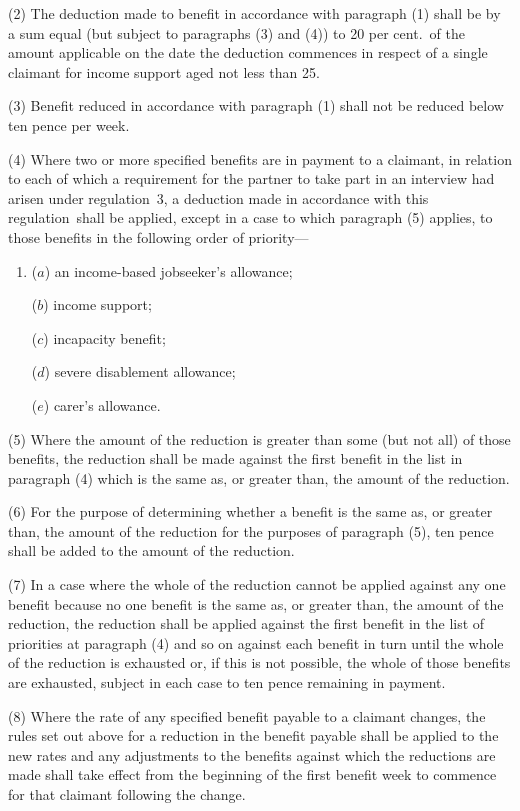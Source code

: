 \documentclass[12pt,a4paper]{article}
\begin{document}
(2) The deduction made to benefit in accordance with paragraph (1) shall be by a sum equal (but subject to paragraphs (3) and (4)) to 20 per cent.\ of the amount applicable on the date the deduction commences in respect of a single claimant for income support aged not less than 25.

(3) Benefit reduced in accordance with paragraph (1) shall not be reduced below ten pence per week.

(4) Where two or more specified benefits are in payment to a claimant, in relation to each of which a requirement for the partner to take part in an interview had arisen under regulation~3, a deduction made in accordance with this regulation~shall be applied, except in a case to which paragraph (5) applies, to those benefits in the following order of priority—
\begin{enumerate}\item[]
($a$) an income-based jobseeker’s allowance;

($b$) income support;

($c$) incapacity benefit;

($d$) severe disablement allowance;

($e$) carer’s allowance.
\end{enumerate}

(5) Where the amount of the reduction is greater than some (but not all) of those benefits, the reduction shall be made against the first benefit in the list in paragraph (4) which is the same as, or greater than, the amount of the reduction.

(6) For the purpose of determining whether a benefit is the same as, or greater than, the amount of the reduction for the purposes of paragraph (5), ten pence shall be added to the amount of the reduction.

(7) In a case where the whole of the reduction cannot be applied against any one benefit because no one benefit is the same as, or greater than, the amount of the reduction, the reduction shall be applied against the first benefit in the list of priorities at paragraph (4) and so on against each benefit in turn until the whole of the reduction is exhausted or, if this is not possible, the whole of those benefits are exhausted, subject in each case to ten pence remaining in payment.

(8) Where the rate of any specified benefit payable to a claimant changes, the rules set out above for a reduction in the benefit payable shall be applied to the new rates and any adjustments to the benefits against which the reductions are made shall take effect from the beginning of the first benefit week to commence for that claimant following the change.
\end{document}

